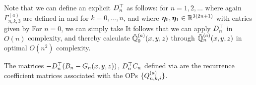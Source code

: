 Note that we can define an explicit $D^\top_n$ as follows:
for $n = 1, 2, \dots$ where again $\Gamma^{(a)}_{n,k,3}$ are defined in  and  for $k=0,\dots,n$, and where $\bm{\eta}_{0}, \bm{\eta}_{1} \in \mathbb{R}^{3(2n+1)}$ with entries given by 
For $n=0$, we can simply take
It follows that we can apply $D^\top_n$ in $O(n)$ complexity, and thereby calculate $\mathbb{\tilde{Q}}^{(a)}_{0}(x,y,z)$  through $\mathbb{\tilde{Q}}^{(a)}_{n}(x,y,z)$ in optimal $O(n^2)$ complexity. 

\begin{definition}\label{def:sc:clenshawmats}
	The matrices $-D^\top_n (B_n-G_n(x,y,z))$, $D^\top_n C_n$ defined via  are the recurrence coefficient matrices associated with the OPs $\{Q_{n,k,i}^{(a)}\}$.
\end{definition}


